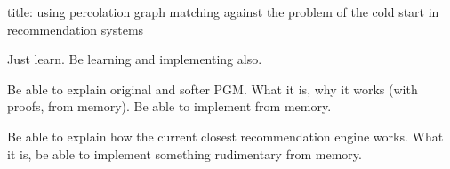 
title: using percolation graph matching against the problem of the cold start in recommendation systems

Just learn. Be learning and implementing also.

Be able to explain original and softer PGM. What it is, why it works (with proofs, from memory). Be able to implement from memory.

Be able to explain how the current closest recommendation engine works. What it is, be able to implement something rudimentary from memory.
